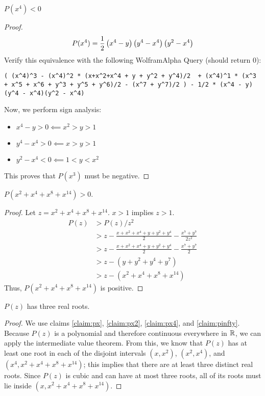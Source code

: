 \documentclass[10pt]{../usamts}
\begin{document}
\begin{solution}
\begin{claim}
    $P(x^4) < 0$
    \label{claim:px4}
\end{claim}
\begin{proof}
    $$P(x^4) = \frac{1}{2} \left( x^4-y \right) \left( y^4 - x^4 \right)\left( y^2 - x^4 \right)$$ 
    Verify this equivalence with the following WolframAlpha Query (should return $0$): 
\begin{lstlisting}
( (x^4)^3 - (x^4)^2 * (x+x^2+x^4 + y + y^2 + y^4)/2  + (x^4)^1 * (x^3 + x^5 + x^6 + y^3 + y^5 + y^6)/2 - (x^7 + y^7)/2 ) - 1/2 * (x^4 - y)(y^4 - x^4)(y^2 - x^4)
\end{lstlisting}
    Now, we perform sign analysis:
    \begin{itemize}
        \item $x^4 - y > 0 \impliedby x^2 > y > 1$
        \item $y^4 - x^4 > 0 \impliedby x > y > 1$
        \item $y^2 - x^4 < 0 \impliedby 1 < y < x^2$
    \end{itemize}
    This proves that $P(x^3)$ must be negative.
\end{proof}

\begin{claim}
    $P(x^2 + x^4 + x^8 + x^{14}) > 0$.
    \label{claim:pinfty}
\end{claim}
\begin{proof}
    Let $z = x^2 + x^4 + x^8 + x^{14}$. $x > 1$ implies $z > 1$.
    \begin{align*}
    P(z) &> P(z)/z^2 \\
         &> z - \frac{x+x^2+x^4+y+y^2+y^4}{2} - \frac{x^7+y^7}{2z^2} \\
         &> z - \frac{x+x^2+x^4+y+y^2+y^4}{2} - \frac{x^7+y^7}{2} \\
         &> z - (y + y^2 + y^4 + y^7) \\
         &> z - (x^2 + x^4 + x^8 + x^{14})
    \end{align*}
    Thus,  $P(x^2 + x^4 + x^8 + x^{14})$ is positive.
\end{proof}

\begin{claim}
    $P(z)$ has three real roots.
\end{claim}

\begin{proof}
    We use claims \ref{claim:px}, \ref{claim:px2}, \ref{claim:px4}, and \ref{claim:pinfty}.
    Because $P(z)$ is a polynomial and therefore continuous everywhere in $\mathbb{R}$, we can apply the intermediate value theorem.
    From this, we know that $P(z)$ has at least one root in each of the disjoint intervals $(x, x^2)$, $(x^2, x^4)$, and $(x^4, x^2 + x^4 + x^8 + x^{14})$; this implies that there are at least three distinct real roots. Since $P(z)$ is cubic and can have at most three roots, all of its roots must lie inside $(x,x^2 + x^4 + x^8 + x^{14})$.
\end{proof}

\end{solution}
\end{document}
